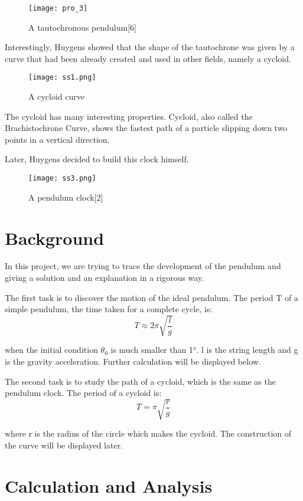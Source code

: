 \documentclass{article}
\begin{document}
\begin{figure}[H]
 \centering
 \texttt{[image: pro\_3]}
 \caption{A tautochronous pendulum[6]}
 \end{figure}
  		 Interestingly, Huygens showed that the shape of the tautochrone was given by a curve that had been already created and used in other fields, namely a cycloid.
  	  \begin{figure}[H]
 \small
 \centering
 \texttt{[image: ss1.png]}
 \caption{A cycloid curve}
 \end{figure}
 \par The cycloid has many interesting properties. Cycloid, also called the Brachistochrone Curve, shows the fastest path of a particle slipping down two points in a vertical direction.
 \par Later, Huygens decided to build this clock himself. 
  	  \begin{figure}[H]
 \small
 \centering
 \texttt{[image: ss3.png]}
 \caption{A pendulum clock[2]}
 \end{figure}
\section{Background}
\par In this project, we are trying to trace the development of the pendulum and giving a solution and an explanation in a rigorous way. 
\par  The first task is to discover the motion of the ideal pendulum. The period T of a simple pendulum, the time taken for a complete cycle, is:
\begin{equation*}
T\approx2\pi\sqrt{\frac{l}{g}}
\end{equation*}
\par when the initial condition $\theta_0$ is much smaller than 1$^o$. l is the string length and g is the gravity acceleration. Further calculation will be displayed below.
\par The second task is to study the path of a cycloid, which is the same as the pendulum clock. The period of a cycloid is:
\begin{equation*}
T=\pi\sqrt{\frac{r}{g}}
\end{equation*}
\par where r is the radius of the circle which makes the cycloid. The construction of the curve will be displayed later. 


\section{Calculation and Analysis}
\end{document}
